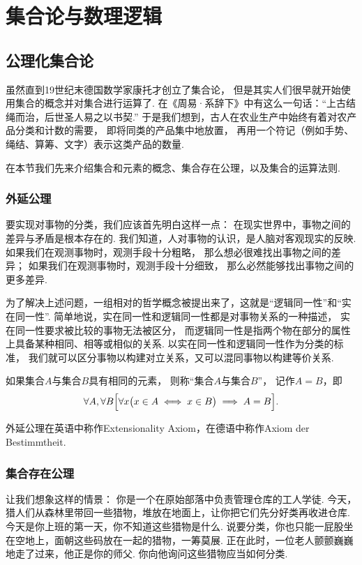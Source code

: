 \chapter{集合论与数理逻辑}

\section{公理化集合论}
虽然直到19世纪末德国数学家康托才创立了集合论，
但是其实人们很早就开始使用集合的概念并对集合进行运算了.
在《周易·系辞下》中有这么一句话：“上古结绳而治，后世圣人易之以书契.”
于是我们想到，古人在农业生产中始终有着对农产品分类和计数的需要，
即将同类的产品集中地放置，
再用一个符记（例如手势、绳结、算筹、文字）表示这类产品的数量.

在本节我们先来介绍集合和元素的概念、集合存在公理，以及集合的运算法则.

\subsection{外延公理}
要实现对事物的分类，我们应该首先明白这样一点：
在现实世界中，事物之间的差异与矛盾是根本存在的.
我们知道，人对事物的认识，是人脑对客观现实的反映.
如果我们在观测事物时，观测手段十分粗略，
那么想必很难找出事物之间的差异；
如果我们在观测事物时，观测手段十分细致，
那么必然能够找出事物之间的更多差异.

为了解决上述问题，一组相对的哲学概念被提出来了，这就是“逻辑同一性”和“实在同一性”.
简单地说，实在同一性和逻辑同一性都是对事物关系的一种描述，
实在同一性要求被比较的事物无法被区分，
而逻辑同一性是指两个物在部分的属性上具备某种相同、相等或相似的关系.
以实在同一性和逻辑同一性作为分类的标准，
我们就可以区分事物以构建对立关系，又可以混同事物以构建等价关系.


\begin{axiom}[外延公理]
如果集合\(A\)与集合\(B\)具有相同的元素，
则称“集合\(A\)与集合\(B\)”，
记作\(A=B\)，即\[
	\forall A, \forall B \Bigl[
		\forall x \bigl( x \in A \iff x \in B \bigr)
		\implies A = B
	\Bigr].
\]
\end{axiom}
外延公理在英语中称作Extensionality Axiom，在德语中称作Axiom der Bestimmtheit.


\subsection{集合存在公理}
让我们想象这样的情景：
你是一个在原始部落中负责管理仓库的工人学徒.
今天，猎人们从森林里带回一些猎物，堆放在地面上，让你把它们先分好类再收进仓库.
今天是你上班的第一天，你不知道这些猎物是什么.
说要分类，你也只能一屁股坐在空地上，面朝这些码放在一起的猎物，一筹莫展.
正在此时，一位老人颤颤巍巍地走了过来，他正是你的师父.
你向他询问这些猎物应当如何分类.


